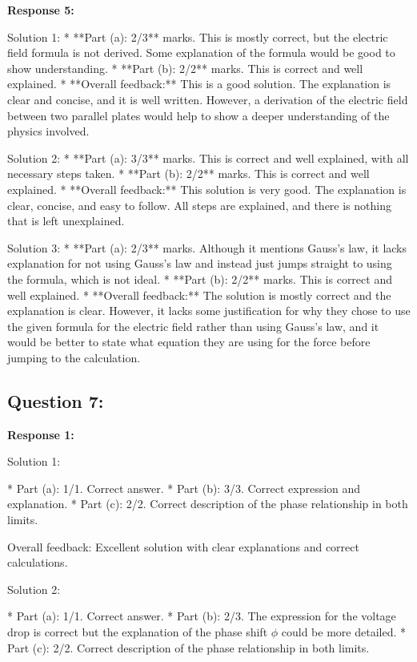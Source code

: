 \documentclass[a4paper,11pt]{article}
\begin{document}
\bigskip    
\textbf{Response 5:}

Solution 1: 
* **Part (a): 2/3** marks. This is mostly correct, but the electric field formula is not derived. Some explanation of the formula would be good to show understanding.
* **Part (b): 2/2** marks. This is correct and well explained.
* **Overall feedback:** This is a good solution. The explanation is clear and concise, and it is well written. However, a derivation of the electric field between two parallel plates would help to show a deeper understanding of the physics involved.

Solution 2:
* **Part (a): 3/3** marks. This is correct and well explained, with all necessary steps taken.
* **Part (b): 2/2** marks. This is correct and well explained.
* **Overall feedback:** This solution is very good. The explanation is clear, concise, and easy to follow. All steps are explained, and there is nothing that is left unexplained.

Solution 3:
* **Part (a): 2/3** marks. Although it mentions Gauss's law, it lacks explanation for not using Gauss's law and instead just jumps straight to using the formula, which is not ideal.
* **Part (b): 2/2** marks. This is correct and well explained.
* **Overall feedback:** The solution is mostly correct and the explanation is clear. However, it lacks some justification for why they chose to use the given formula for the electric field rather than using Gauss's law, and it would be better to state what equation they are using for the force before jumping to the calculation.

\subsection*{Question 7:}

\textbf{Response 1:}

Solution 1:

*   Part (a): 1/1. Correct answer.
*   Part (b): 3/3. Correct expression and explanation.
*   Part (c): 2/2. Correct description of the phase relationship in both limits.

Overall feedback: Excellent solution with clear explanations and correct calculations.

Solution 2:

*   Part (a): 1/1. Correct answer.
*   Part (b): 2/3. The expression for the voltage drop is correct but the explanation of the phase shift \( \phi \) could be more detailed.
*   Part (c): 2/2. Correct description of the phase relationship in both limits.
\end{document}
